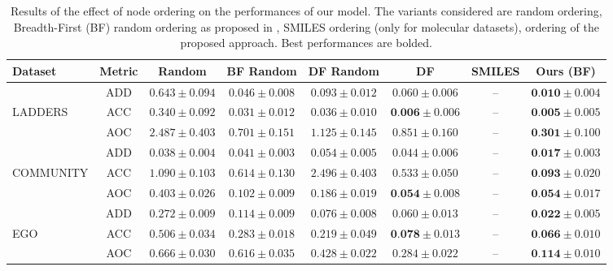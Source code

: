 \begin{table}
    \centering
    \caption{Results of the effect of node ordering on the performances of our model. The variants considered are random ordering, Breadth-First (BF) random ordering as proposed in \cite{you2018graphrnn}, SMILES ordering (only for molecular datasets), ordering of the proposed approach. Best performances are bolded.}
    \label{tab:graph-ordering-qualitative}
    \renewcommand{\arraystretch}{1.2}
    \begin{tabular}{lccccccc}
        \toprule
         \textbf{Dataset} & \textbf{Metric} & \textbf{Random} & \textbf{BF Random} & \textbf{DF Random} & \textbf{DF} & \textbf{SMILES} & \textbf{Ours (BF)}\\
         \midrule
          & ADD           & $0.643 \pm 0.094$ & $0.046 \pm 0.008$ & $0.093 \pm 0.012$ & $0.060 \pm 0.006$ & --                           & $\textbf{0.010} \pm 0.004$\\
          LADDERS & ACC   & $0.340 \pm 0.092$ & $0.031 \pm 0.012$ & $0.036 \pm 0.010$ & $\textbf{0.006} \pm 0.006$ & --                           & $\textbf{0.005} \pm 0.005$\\
          & AOC           & $2.487 \pm 0.403$ & $0.701 \pm 0.151$ & $1.125 \pm 0.145$ & $0.851 \pm 0.160$ & --                           & $\textbf{0.301} \pm 0.100$\\
         \midrule
          & ADD           & $0.038 \pm 0.004$ & $0.041 \pm 0.003$ & $0.054 \pm 0.005$ & $0.044 \pm 0.006$ & --                           & $\textbf{0.017} \pm 0.003$\\
          COMMUNITY & ACC & $1.090 \pm 0.103$ & $0.614 \pm 0.130$ & $2.496 \pm 0.403$ & $0.533 \pm 0.050$ & --                           & $\textbf{0.093} \pm 0.020$\\
          & AOC           & $0.403 \pm 0.026$ & $0.102 \pm 0.009$ & $0.186 \pm 0.019$ & $\textbf{0.054} \pm 0.008$ & --                           & $\textbf{0.054} \pm 0.017$\\
          \midrule
          & ADD           & $0.272 \pm 0.009$ & $0.114 \pm 0.009$ & $0.076 \pm 0.008$ & $0.060 \pm 0.013$ & --                           & $\textbf{0.022} \pm 0.005$\\
          EGO & ACC       & $0.506 \pm 0.034$ & $0.283 \pm 0.018$ & $0.219 \pm 0.049$ & $\textbf{0.078} \pm 0.013$ & --                           & $\textbf{0.066} \pm 0.010$\\
          & AOC           & $0.666 \pm 0.030$ & $0.616 \pm 0.035$ & $0.428 \pm 0.022$ & $0.284 \pm 0.022$ & --                           & $\textbf{0.114} \pm 0.010$\\

\end{tabular}
\end{table}
